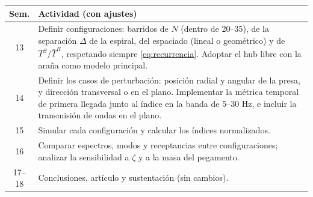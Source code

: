 \documentclass[11pt,letterpaper]{article}
\begin{document}
\begin{table}[H]
\centering\small
\begin{tabular}{@{}cp{14cm}@{}}
\toprule
Sem. & Actividad (con ajustes) \\
\midrule
13 & Definir configuraciones: barridos de $N$ (dentro de 20--35), de la
separación $\Delta$ de la espiral, del espaciado (lineal o geométrico) y de
$T^S/\bar{T}^R$, respetando siempre \eqref{eq:recurrencia}. Adoptar el hub
libre con la araña como modelo principal. \\
14 & Definir los casos de perturbación: posición radial y angular de la
presa, y dirección transversal o en el plano. Implementar la métrica
temporal de primera llegada junto al índice en la banda de 5--30 Hz, e
incluir la transmisión de ondas en el plano. \\
15 & Simular cada configuración y calcular los índices normalizados. \\
16 & Comparar espectros, modos y receptancias entre configuraciones;
analizar la sensibilidad a $\zeta$ y a la masa del pegamento. \\
17--18 & Conclusiones, artículo y sustentación (sin cambios). \\
\bottomrule
\end{tabular}
\end{table}
\end{document}
